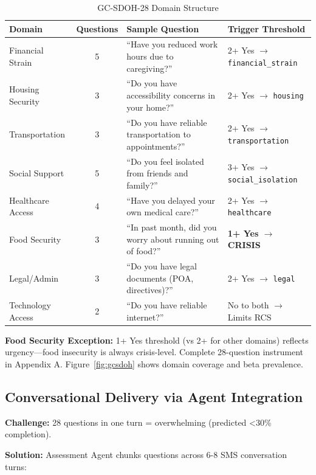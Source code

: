 \documentclass{article}%
\begin{document}
\begin{table}[h]
\centering
\caption{GC-SDOH-28 Domain Structure}
\label{table:sdoh_domains}
\small
\begin{tabular}{p{2.5cm}cp{4.5cm}p{2.8cm}}
\toprule
\textbf{Domain} & \textbf{Questions} & \textbf{Sample Question} & \textbf{Trigger Threshold} \\
\midrule
Financial Strain & 5 & ``Have you reduced work hours due to caregiving?'' & 2+ Yes $\rightarrow$ \texttt{financial\_strain} \\
Housing Security & 3 & ``Do you have accessibility concerns in your home?'' & 2+ Yes $\rightarrow$ \texttt{housing} \\
Transportation & 3 & ``Do you have reliable transportation to appointments?'' & 2+ Yes $\rightarrow$ \texttt{transportation} \\
Social Support & 5 & ``Do you feel isolated from friends and family?'' & 3+ Yes $\rightarrow$ \texttt{social\_isolation} \\
Healthcare Access & 4 & ``Have you delayed your own medical care?'' & 2+ Yes $\rightarrow$ \texttt{healthcare} \\
Food Security & 3 & ``In past month, did you worry about running out of food?'' & \textbf{1+ Yes $\rightarrow$ CRISIS} \\
Legal/Admin & 3 & ``Do you have legal documents (POA, directives)?'' & 2+ Yes $\rightarrow$ \texttt{legal} \\
Technology Access & 2 & ``Do you have reliable internet?'' & No to both $\rightarrow$ Limits RCS \\
\bottomrule
\end{tabular}
\end{table}

\textbf{Food Security Exception:} 1+ Yes threshold (vs 2+ for other domains) reflects urgency—food insecurity is always crisis-level. Complete 28-question instrument in Appendix A. Figure~\ref{fig:gcsdoh} shows domain coverage and beta prevalence.

%
\subsection{Conversational Delivery via Agent Integration}%
\label{subsec:ConversationalDeliveryviaAgentIntegration}%
\textbf{Challenge:} 28 questions in one turn = overwhelming (predicted <30\% completion).

\textbf{Solution:} Assessment Agent chunks questions across 6-8 SMS conversation turns:
\end{document}

